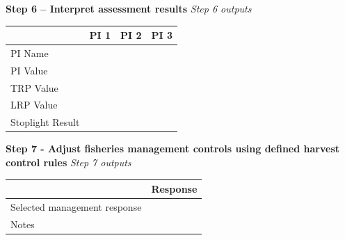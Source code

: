 \documentclass[]{book}
\begin{document}
\textbf{Step 6 -- Interpret assessment results} \emph{Step 6 outputs}

\begin{tabular}{l|l|l|l}
\hline
  & PI 1 & PI 2 & PI 3\\
\hline
PI Name &  &  & \\
\hline
PI Value &  &  & \\
\hline
TRP Value &  &  & \\
\hline
LRP Value &  &  & \\
\hline
Stoplight Result &  &  & \\
\hline
\end{tabular}

\textbf{Step 7 - Adjust fisheries management controls using defined
harvest control rules} \emph{Step 7 outputs}

\begin{tabular}{l|l}
\hline
  & Response\\
\hline
Selected management response & \\
\hline
Notes & \\
\hline
\end{tabular}


\end{document}
